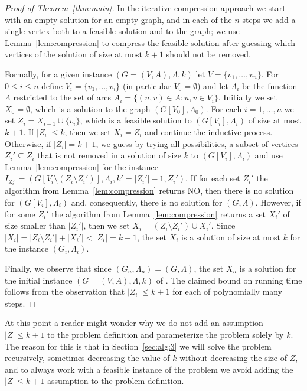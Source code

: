 \documentclass[11pt]{article}
\theoremstyle{definition}
\newcommand{\gfvs}{{\sc{Group Feedback Vertex Set}}\xspace}
\newcommand{\cgfvsshort}{{\sc{C-GFVS}}\xspace}
\begin{document}
\begin{proof}[Proof of Theorem~\ref{thm:main}]
In the iterative compression approach we start with an empty solution for an empty graph, and in each of the $n$ steps we add a single vertex both to a feasible solution and to the graph; we use Lemma~\ref{lem:compression} to compress the feasible solution after guessing which vertices of the solution of size at most $k+1$ should not be removed.

Formally, for a given instance $(G=(V,A),\Lambda,k)$ let $V = \{v_1, \ldots, v_n\}$.
For $0 \le i \le n$ define $V_i = \{v_1,\ldots,v_i\}$ (in particular $V_0=\emptyset$)
and let $\Lambda_i$ be the function $\Lambda$ restricted to the set
of arcs $A_i=\{(u,v) \in A : u,v \in V_i\}$.
Initially we set $X_0=\emptyset$, which is a solution to the graph $(G[V_0],\Lambda_0)$.
For each $i=1,\ldots,n$ we set $Z_i=X_{i-1} \cup \{v_i\}$, which is a feasible solution
to $(G[V_i],\Lambda_i)$ of size at most $k+1$.
If $|Z_i| \le k$, then we set $X_i=Z_i$ and continue the inductive process.
Otherwise, if $|Z_i| = k+1$, we guess by trying all possibilities, a subset of vertices
$Z_i' \subseteq Z_i$ that is not removed in a solution of size $k$ to $(G[V_i],\Lambda_i)$
and use Lemma~\ref{lem:compression} for the instance $I_{Z_i'}=(G[V_i\setminus (Z_i \setminus Z_i')],\Lambda_i,k'=|Z_i'|-1,Z_i')$.
If for each set $Z_i'$ the algorithm from Lemma~\ref{lem:compression} returns NO, 
then there is no solution for $(G[V_i],\Lambda_i)$ and, consequently,
there is no solution for $(G,\Lambda)$.
However, if for some $Z_i'$ the algorithm from Lemma~\ref{lem:compression}
returns a set $X_i'$ of size smaller than $|Z_i'|$, then we set $X_i = (Z_i \setminus Z_i') \cup X_i'$.
Since $|X_i| = |Z_i \setminus Z_i'| + |X_i'| < |Z_i| = k+1$,
the set $X_i$ is a solution of size at most $k$ for the instance $(G_i,\Lambda_i)$.

Finally, we observe that since $(G_n,\Lambda_n)=(G,\Lambda)$, the set $X_n$
is a solution for the initial instance $(G=(V,A),\Lambda,k)$ of \gfvs. The claimed bound on running time follows from the observation that $|Z_i|\leq k+1$ for each of polynomially many steps.
\end{proof}

At this point a reader might wonder why we do not add an assumption $|Z| \le k+1$ to the \cgfvsshort problem
definition and parameterize the problem solely by $k$. 
The reason for this is that in Section~\ref{sec:alg:3} we will solve the \cgfvsshort problem
recursively, sometimes decreasing the value of $k$ without decreasing the size of $Z$,
and to always work with a feasible instance of the \cgfvsshort problem we avoid adding the $|Z| \le k+1$
assumption to the problem definition.
\end{document}
